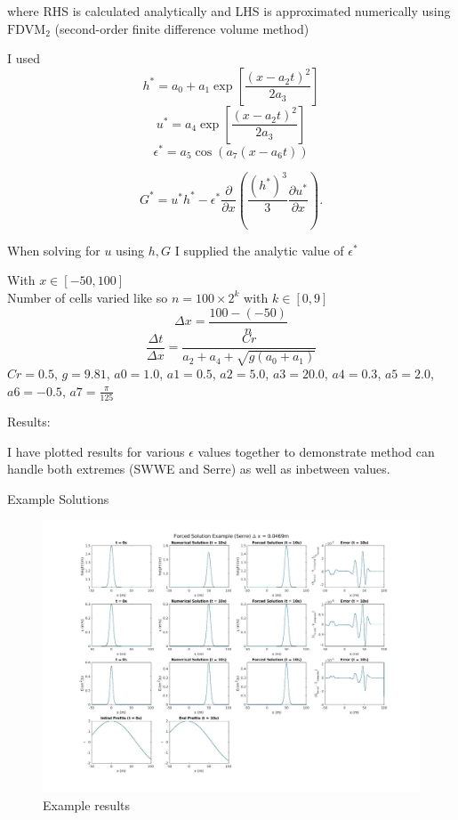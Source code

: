 \documentclass[10pt]{article}
\begin{document}
	where RHS is calculated analytically and LHS is approximated numerically using $\text{FDVM}_2$ (second-order finite difference volume method)
	
	I used 
	\[h^* = a_0 + a_1 \exp \left[ \dfrac{\left(x - a_2 t\right)^2}{2a_3}\right]\]
	\[u^* = a_4 \exp \left[ \dfrac{\left(x - a_2 t\right)^2}{2a_3}\right]\]
	\[\epsilon^* = a_5 \cos\left(a_7(x - a_6 t)\right) \]
	
	\[
	G^* = u^*h^* - \epsilon^* \frac{\partial }{\partial x} \left ( \dfrac{(h^*)^3}{3} \frac{\partial u^*}{\partial x} \right ).
	\]
	
	When solving for $u$ using $h,G$ I supplied the analytic value of $\epsilon^*$
	
	
	With
	$x \in \left[-50,100\right]$\\
	Number of cells varied like so $n = 100\times2^k$ with $k \in \left[0,9\right]$\\
	$$\Delta x = \frac{100 - (-50)}{n}$$
	$$\frac{\Delta t}{\Delta x} = \frac{Cr}{a_2 + a_4 + \sqrt{g(a_0 + a_1)}}$$
	$Cr = 0.5$, 
	$g =   9.81 $,  
	$a0 =   1.0$,   
	$a1 =   0.5$,   
	$a2 =   5.0$,    
	$a3 =   20.0$,    
	$a4 =   0.3$,
	$a5 =   2.0$,
	$a6 =   -0.5$,
	$a7 =   \frac{\pi}{125}$
	
	Results:
	 
	I have plotted results for various $\epsilon$ values together to demonstrate method can handle both extremes (SWWE and Serre) as well as inbetween values.
	
	Example Solutions

	\begin{figure}[h!]
		\includegraphics[width=23.0cm]{ExampleResults.jpg}
		\caption{Example results }
	\end{figure}
\end{document}
